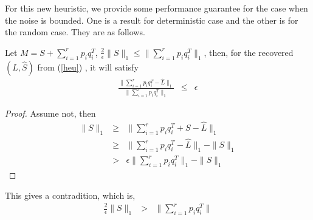 For this new heuristic, we provide some performance guarantee for the case
when the noise is bounded. One is a result for deterministic case
and the other is for the random case. They are as follows.
\begin{prop}
Let $M=S+\sum_{i=1}^{r}p_{i}q_{i}^{T}$, $\frac{2}{\epsilon}\|S\|_{1}\le\|\sum_{i=1}^{r}p_{i}q_{i}^{T}\|_{1}$,
then, for the recovered $(\hat{L},\hat{S})$ from (\ref{heu}) , it
will satisfy
\begin{eqnarray*}
\frac{\|\sum_{i=1}^{r}p_{i}q_{i}^{T}-\hat{L}\|_{1}}{\|\sum_{i=1}^{r}p_{i}q_{i}^{T}\|_{1}} & \le & \epsilon
\end{eqnarray*}
\end{prop}
\begin{proof}
Assume not, then
\begin{eqnarray*}
\|S\|_{1} & \ge & \|\sum_{i=1}^{r}p_{i}q_{i}^{T}+S-\hat{L}\|_{1}\\
 & \ge & \|\sum_{i=1}^{r}p_{i}q_{i}^{T}-\hat{L}\|_{1}-\|S\|_{1}\\
 & > & \epsilon\|\sum_{i=1}^{r}p_{i}q_{i}^{T}\|_{1}-\|S\|_{1}
\end{eqnarray*}

\end{proof}
This gives a contradition, which is,
\begin{eqnarray*}
\frac{2}{\epsilon}\|S\|_{1} & > & \|\sum_{i=1}^{r}p_{i}q_{i}^{T}\|
\end{eqnarray*}

